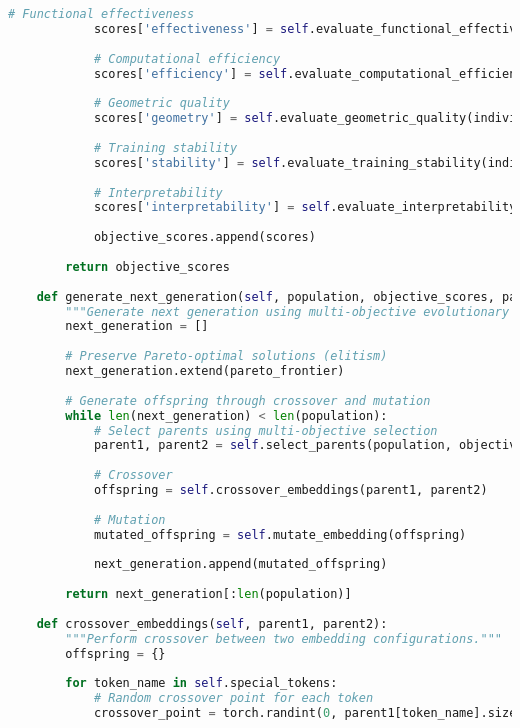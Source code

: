\begin{lstlisting}[language=Python, caption=Multi-objective embedding optimization]
            # Functional effectiveness
            scores['effectiveness'] = self.evaluate_functional_effectiveness(individual)
            
            # Computational efficiency
            scores['efficiency'] = self.evaluate_computational_efficiency(individual)
            
            # Geometric quality
            scores['geometry'] = self.evaluate_geometric_quality(individual)
            
            # Training stability
            scores['stability'] = self.evaluate_training_stability(individual)
            
            # Interpretability
            scores['interpretability'] = self.evaluate_interpretability(individual)
            
            objective_scores.append(scores)
        
        return objective_scores
    
    def generate_next_generation(self, population, objective_scores, pareto_frontier):
        """Generate next generation using multi-objective evolutionary operators."""
        next_generation = []
        
        # Preserve Pareto-optimal solutions (elitism)
        next_generation.extend(pareto_frontier)
        
        # Generate offspring through crossover and mutation
        while len(next_generation) < len(population):
            # Select parents using multi-objective selection
            parent1, parent2 = self.select_parents(population, objective_scores)
            
            # Crossover
            offspring = self.crossover_embeddings(parent1, parent2)
            
            # Mutation
            mutated_offspring = self.mutate_embedding(offspring)
            
            next_generation.append(mutated_offspring)
        
        return next_generation[:len(population)]
    
    def crossover_embeddings(self, parent1, parent2):
        """Perform crossover between two embedding configurations."""
        offspring = {}
        
        for token_name in self.special_tokens:
            # Random crossover point for each token
            crossover_point = torch.randint(0, parent1[token_name].size(0), (1,)).item()
            

\end{lstlisting}
